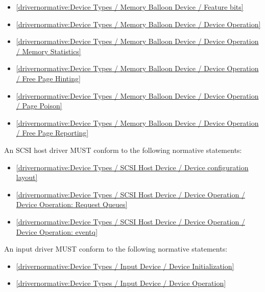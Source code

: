 \begin{itemize}
\item \ref{drivernormative:Device Types / Memory Balloon Device / Feature bits}
\item \ref{drivernormative:Device Types / Memory Balloon Device / Device Operation}
\item \ref{drivernormative:Device Types / Memory Balloon Device / Device Operation / Memory Statistics}
\item \ref{drivernormative:Device Types / Memory Balloon Device / Device Operation / Free Page Hinting}
\item \ref{drivernormative:Device Types / Memory Balloon Device / Device Operation / Page Poison}
\item \ref{drivernormative:Device Types / Memory Balloon Device / Device Operation / Free Page Reporting}
\end{itemize}

\label{sec:Conformance / Driver Conformance / SCSI Host Driver Conformance}

An SCSI host driver MUST conform to the following normative statements:

\begin{itemize}
\item \ref{drivernormative:Device Types / SCSI Host Device / Device configuration layout}
\item \ref{drivernormative:Device Types / SCSI Host Device / Device Operation / Device Operation: Request Queues}
\item \ref{drivernormative:Device Types / SCSI Host Device / Device Operation / Device Operation: eventq}
\end{itemize}

\label{sec:Conformance / Driver Conformance / Input Driver Conformance}

An input driver MUST conform to the following normative statements:

\begin{itemize}
\item \ref{drivernormative:Device Types / Input Device / Device Initialization}
\item \ref{drivernormative:Device Types / Input Device / Device Operation}
\end{itemize}

